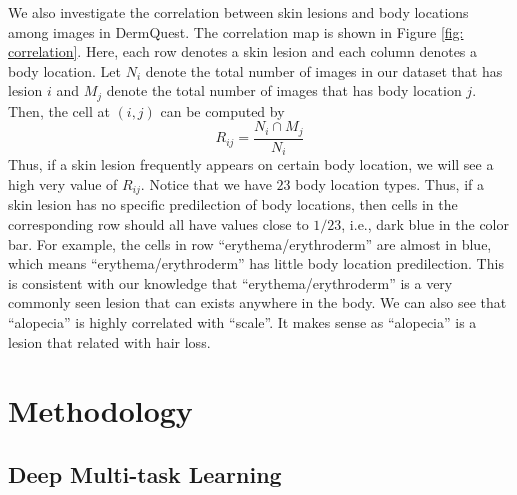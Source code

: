 \documentclass[letterpaper]{article}
\begin{document}
We also investigate the correlation between skin lesions and body locations
among images in DermQuest. The correlation map is shown in Figure \ref{fig: correlation}.
Here, each row denotes a skin lesion and each column denotes a body location.
Let $N_i$ denote the total number of images in our dataset that has lesion $i$
and $M_j$ denote the total number of images that has body location $j$. Then, the
cell at $(i, j)$ can be computed by
\begin{equation}
R_{ij} = \frac{N_i \cap M_j}{N_i}
\end{equation}
Thus, if a skin lesion frequently appears on certain body location, we will see
a high very value of $R_{ij}$. Notice that we have $23$ body location types. Thus,
if a skin lesion has no specific predilection of body locations, then cells in
the corresponding row should all have values close to $1/23$, i.e., dark blue in
the color bar. For example, the cells in row ``erythema/erythroderm'' are almost
in blue, which means ``erythema/erythroderm'' has little body location predilection.
This is consistent with our knowledge that ``erythema/erythroderm'' is a very
commonly seen lesion that can exists anywhere in the body. We can also see that 
``alopecia'' is highly correlated with ``scale''. It makes sense as ``alopecia''
is a lesion that related with hair loss.

\section{Methodology}

\subsection{Deep Multi-task Learning}
\end{document}
